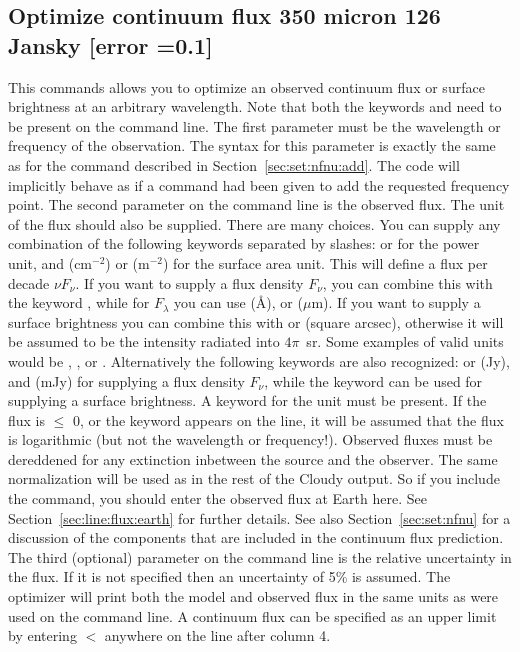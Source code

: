 \subsection{Optimize continuum flux 350 micron 126 Jansky [error =0.1]}
\label{sec:opt:cont:flux}

This commands allows you to optimize an observed continuum flux or surface brightness at an
arbitrary wavelength. Note that both the keywords  and
 need to be present on the command line. The first parameter
must be the wavelength or frequency of the observation. The syntax for this
parameter is exactly the same as for the  command
described in Section~\ref{sec:set:nfnu:add}. The code will implicitly behave
as if a  command had been given to add the requested
frequency point. The second parameter
on the command line is the observed flux. The unit of the flux should also
be supplied. There are many choices. You can supply any combination of the
following keywords separated by slashes:  or 
for the power unit, and  (cm$^{-2}$) or 
(m$^{-2}$) for the surface area unit. This will define a flux per decade $\nu
F_\nu$. If you want to supply a flux density $F_\nu$, you can combine this
with the keyword , while for $F_\lambda$ you can use 
(\AA),  or  ($\mu$m). If you want to supply a surface
brightness you can combine this with  or  (square arcsec),
otherwise it will be assumed to be the intensity radiated into $4\pi$~sr.
Some examples of valid units would be ,
, or . Alternatively the
following keywords are also recognized:  or
 (Jy), and  (mJy) for supplying a flux density $F_\nu$,
while the keyword  can be used for supplying a surface
brightness. A keyword for the unit must be present.
If the flux is $\leq$ 0, or the keyword
 appears on the line, it will be assumed that the flux is
logarithmic (but not the wavelength or frequency!). Observed fluxes must be
dereddened for any extinction inbetween the source and the observer. The same
normalization will be used as in the rest of the Cloudy output. So if you
include the  command, you should enter the
observed flux at Earth here. See Section~\ref{sec:line:flux:earth} for further
details. See also Section~\ref{sec:set:nfnu} for a discussion of the
components that are included in the continuum flux prediction. The third
(optional) parameter on the command line is the relative uncertainty in the
flux. If it is not specified then an uncertainty of 5\% is assumed. The optimizer
will print both the model and observed flux in the same units as were used on the
command line.
A continuum flux can be specified as an upper limit by entering
$<$ anywhere on the line after column 4.

